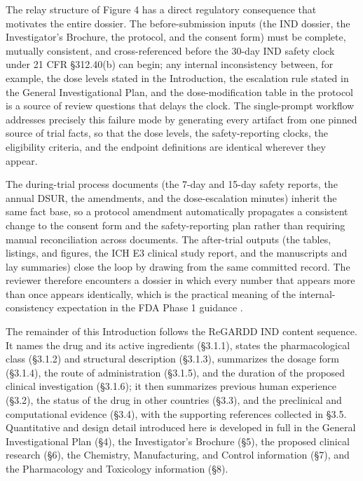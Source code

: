 The relay structure of Figure 4 has a direct regulatory consequence that motivates
the entire dossier. The before-submission inputs (the IND dossier, the
Investigator's Brochure, the protocol, and the consent form) must be complete,
mutually consistent, and cross-referenced before the 30-day IND safety clock under
21 CFR \S 312.40(b) can begin; any internal inconsistency between, for example, the
dose levels stated in the Introduction, the escalation rule stated in the General
Investigational Plan, and the dose-modification table in the protocol is a source
of review questions that delays the clock. The single-prompt workflow addresses
precisely this failure mode by generating every artifact from one pinned source of
trial facts, so that the dose levels, the safety-reporting clocks, the eligibility
criteria, and the endpoint definitions are identical wherever they appear. 

The
during-trial process documents (the 7-day and 15-day safety reports, the annual
DSUR, the amendments, and the dose-escalation minutes) inherit the same fact base,
so a protocol amendment automatically propagates a consistent change to the consent
form and the safety-reporting plan rather than requiring manual reconciliation
across documents. The after-trial outputs (the tables, listings, and figures, the
ICH E3 clinical study report, and the manuscripts and lay summaries) close the loop
by drawing from the same committed record. The reviewer therefore encounters a
dossier in which every number that appears more than once appears identically,
which is the practical meaning of the internal-consistency expectation in the FDA
Phase 1 guidance \cite{phase1guidance, oncotrialllm}.

The remainder of this Introduction follows the ReGARDD IND content sequence. It
names the drug and its active ingredients (\S 3.1.1), states the pharmacological
class (\S 3.1.2) and structural description (\S 3.1.3), summarizes the dosage form
(\S 3.1.4), the route of administration (\S 3.1.5), and the duration of the
proposed clinical investigation (\S 3.1.6); it then summarizes previous human
experience (\S 3.2), the status of the drug in other countries (\S 3.3), and the
preclinical and computational evidence (\S 3.4), with the supporting references
collected in \S 3.5. Quantitative and design detail introduced here is developed
in full in the General Investigational Plan (\S 4), the Investigator's Brochure
(\S 5), the proposed clinical research (\S 6), the Chemistry, Manufacturing, and
Control information (\S 7), and the Pharmacology and Toxicology information (\S 8).

